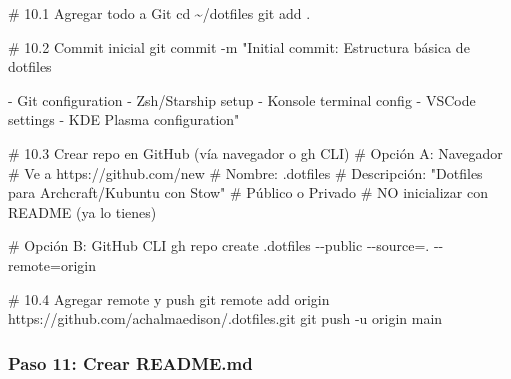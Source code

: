 \documentclass[
  doc,
  floatsintext,
  longtable,
  a4paper,
  nolmodern,
  notxfonts,
  notimes,
  12pt,
  colorlinks=true,linkcolor=blue,citecolor=blue,urlcolor=blue]{apa7}
\newenvironment{Shaded}{\begin{snugshade}}{\end{snugshade}}
\newcommand{\AttributeTok}[1]{\textcolor[rgb]{0.40,0.45,0.13}{#1}}
\newcommand{\BuiltInTok}[1]{\textcolor[rgb]{0.00,0.23,0.31}{#1}}
\newcommand{\CommentTok}[1]{\textcolor[rgb]{0.37,0.37,0.37}{#1}}
\newcommand{\ExtensionTok}[1]{\textcolor[rgb]{0.00,0.23,0.31}{#1}}
\newcommand{\FunctionTok}[1]{\textcolor[rgb]{0.28,0.35,0.67}{#1}}
\newcommand{\NormalTok}[1]{\textcolor[rgb]{0.00,0.23,0.31}{#1}}
\newcommand{\OperatorTok}[1]{\textcolor[rgb]{0.37,0.37,0.37}{#1}}
\newcommand{\StringTok}[1]{\textcolor[rgb]{0.13,0.47,0.30}{#1}}
\begin{document}
\begin{Shaded}
\begin{Highlighting}[]
\CommentTok{\# 10.1 Agregar todo a Git}
\BuiltInTok{cd}\NormalTok{ \textasciitilde{}/dotfiles}
\FunctionTok{git}\NormalTok{ add .}

\CommentTok{\# 10.2 Commit inicial}
\FunctionTok{git}\NormalTok{ commit }\AttributeTok{{-}m} \StringTok{"Initial commit: Estructura básica de dotfiles}

\StringTok{{-} Git configuration}
\StringTok{{-} Zsh/Starship setup}
\StringTok{{-} Konsole terminal config}
\StringTok{{-} VSCode settings}
\StringTok{{-} KDE Plasma configuration"}

\CommentTok{\# 10.3 Crear repo en GitHub (vía navegador o gh CLI)}
\CommentTok{\# Opción A: Navegador}
\CommentTok{\# Ve a https://github.com/new}
\CommentTok{\# Nombre: .dotfiles}
\CommentTok{\# Descripción: "Dotfiles para Archcraft/Kubuntu con Stow"}
\CommentTok{\# Público o Privado}
\CommentTok{\# NO inicializar con README (ya lo tienes)}

\CommentTok{\# Opción B: GitHub CLI}
\ExtensionTok{gh}\NormalTok{ repo create .dotfiles }\AttributeTok{{-}{-}public} \AttributeTok{{-}{-}source}\OperatorTok{=}\NormalTok{. }\AttributeTok{{-}{-}remote}\OperatorTok{=}\NormalTok{origin}

\CommentTok{\# 10.4 Agregar remote y push}
\FunctionTok{git}\NormalTok{ remote add origin https://github.com/achalmaedison/.dotfiles.git}
\FunctionTok{git}\NormalTok{ push }\AttributeTok{{-}u}\NormalTok{ origin main}
\end{Highlighting}
\end{Shaded}

\subsubsection{Paso 11: Crear README.md}\label{paso-11-crear-readme.md}
\end{document}
